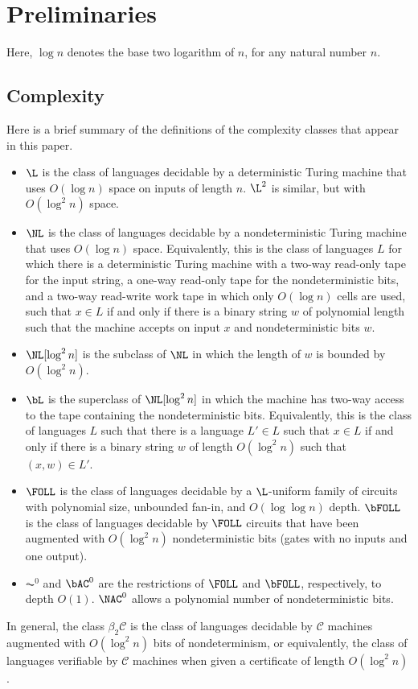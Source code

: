 \section{Preliminaries}

Here, $\log n$ denotes the base two logarithm of $n$, for any natural number $n$.

\subsection{Complexity}

Here is a brief summary of the definitions of the complexity classes that appear in this paper.

\begin{itemize}
\item
  $\L$ is the class of languages decidable by a deterministic Turing machine that uses $O(\log n)$ space on inputs of length $n$.
  $\L^2$ is similar, but with $O(\log^2 n)$ space.
\item
  $\NL$ is the class of languages decidable by a nondeterministic Turing machine that uses $O(\log n)$ space.
  Equivalently, this is the class of languages $L$ for which there is a deterministic Turing machine with a two-way read-only tape for the input string, a one-way read-only tape for the nondeterministic bits, and a two-way read-write work tape in which only $O(\log n)$ cells are used, such that $x \in L$ if and only if there is a binary string $w$ of polynomial length such that the machine accepts on input $x$ and nondeterministic bits $w$.
\item $\NL[\log^2 n]$ is the subclass of $\NL$ in which the length of $w$ is bounded by $O(\log^2 n)$.
\item $\bL$ is the superclass of $\NL[\log^2 n]$ in which the machine has two-way access to the tape containing the nondeterministic bits.
  Equivalently, this is the class of languages $L$ such that there is a language $L' \in L$ such that $x \in L$ if and only if there is a binary string $w$ of length $O(\log^2 n)$ such that $(x, w) \in L'$.
\item
  $\FOLL$ is the class of languages decidable by a $\L$-uniform family of circuits with polynomial size, unbounded fan-in, and $O(\log \log n)$ depth.
  $\bFOLL$ is the class of languages decidable by $\FOLL$ circuits that have been augmented with $O(\log^2 n)$ nondeterministic bits (gates with no inputs and one output).
\item
  $\AC^0$ and $\bAC^0$ are the restrictions of $\FOLL$ and $\bFOLL$, respectively, to depth $O(1)$.
  $\NAC^0$ allows a polynomial number of nondeterministic bits.
\end{itemize}
In general, the class $\beta_2 \mathcal{C}$ is the class of languages decidable by $\mathcal{C}$ machines augmented with $O(\log^2 n)$ bits of nondeterminism, or equivalently, the class of languages verifiable by $\mathcal{C}$ machines when given a certificate of length $O(\log^2 n)$.

